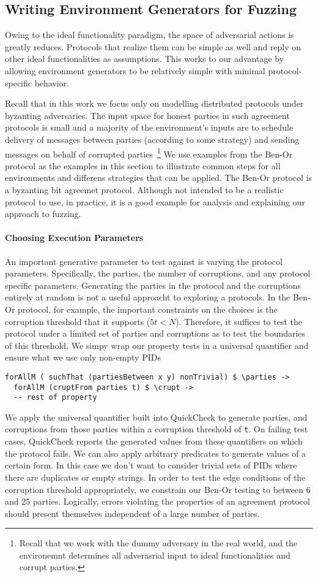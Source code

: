 \subsection{Writing Environment Generators for Fuzzing}
Owing to the ideal functionality paradigm, the space of adversarial actions is greatly reduces.
Protocols that realize them can be simple as well and reply on other ideal functionalities as assumptions.
This works to our advantage by allowing environment generators to be relatively simple with minimal protocol-specific behavior. 

Recall that in this work we focus only on modelling distributed protocols under byzanting adversaries. 
The input space for honest parties in such agreement protocols is small and a majority of the environment's inputs are to schedule delivery of messages between parties (according to some strategy) and sending messages on behalf of corrupted parties~\footnote{Recall that we work with the dummy adversary in the real world, and the environemnt determines all adverasrial input to ideal functionalities and corrupt parties.}
We use examples from the Ben-Or protocol as the examples in this section to illustrate common steps for all environments and differens strategies that can be applied.
The Ben-Or protocol is a byzanting bit agreemet protocol. Although not intended to be a realistic protocol to use, in practice, it is a good example for analysis and explaining our approach to fuzzing.
\paragraph{Choosing Execution Parameters}
An important generative parameter to test against is varying the protocol parameters. Specifically, the parties, the number of corruptions, and any protocol specific parameters.
Generating the parties in the protocol and the corruptions entirely at random is not a useful approacht to exploring a protocols.
In the Ben-Or protocol, for example, the important constraints on the choices is the corruption threshold that it supports ($5t < N$).
Therefore, it suffices to test the protocol under a limited set of parties and corruptions as to test the boundaries of this threshold.
We simpy wrap our property tests in a universal quantifier and ensure what we use only non-empty PIDs
\begin{lstlisting}
forAllM ( suchThat (partiesBetween x y) nonTrivial) $ \parties -> 
  forAllM (cruptFrom parties t) $ \crupt ->
  -- rest of property
\end{lstlisting}
We apply the universal quantifier built into QuickCheck to generate parties, and corruptions from those parties within a corruption threshold of \texttt{t}.
On failing test cases, QuickCheck reports the generated values from these quantifiers on which the protocol fails.
We can also apply arbitrary predicates to generate values of a certain form. In this case we don't want to consider trivial sets of PIDs where there are duplicates or empty strings. 
In order to test the edge conditions of the corruption threshold appropriately, we constrain our Ben-Or testing to between 6 and 25 parties. 
Logically, errors violating the properties of an agreement protocol should present themselves independent of a large number of parties.

